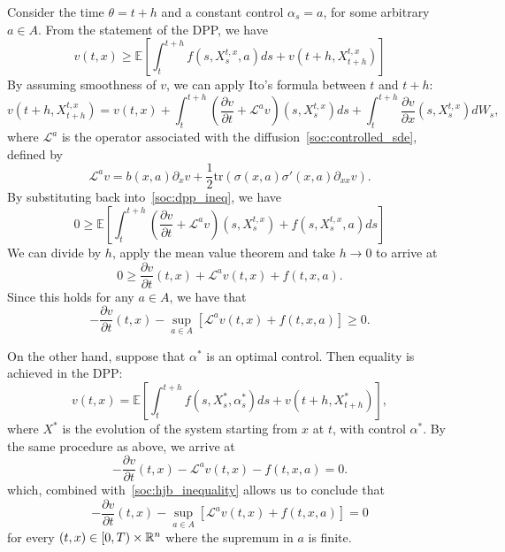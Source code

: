 Consider the time $\theta = t + h$ and a constant control $\alpha_s = a$, for some
arbitrary $a \in A$. From the statement of the DPP, we have
\begin{equation}\label{soc:dpp_ineq}
    v(t,x) \geq \mathbb{E}\left[ \int_t^{t + h} f(s,X^{t,x}_s,a) ds + v(t+h, X^{t,x}_{t+h}) \right]
\end{equation}
By assuming smoothness of $v$, we can apply Ito's formula between $t$ and $t+ h$:
\begin{equation*}
    v(t+h, X^{t,x}_{t+h}) = v(t,x) + \int^{t+h}_t \left( \frac{\partial v}{\partial t} + \mathcal{L}^a v\right)(s, X^{t,x}_s) ds + \int_t^{t+h} \frac{\partial v}{\partial x} (s, X^{t,x}_s) dW_s,
\end{equation*}
where $\mathcal{L}^a$ is the operator associated with the
diffusion~\eqref{soc:controlled_sde}, defined by
\begin{equation}
    \mathcal{L}^a v = b(x,a) \partial_x v + \frac{1}{2}\text{tr} (\sigma(x,a) \sigma'(x,a) \partial_{xx}v).
\end{equation}
By substituting back into~\eqref{soc:dpp_ineq}, we have
\begin{equation*}
    0 \geq \mathbb{E}\left[ \int^{t+h}_t \left( \frac{\partial v}{\partial t} + \mathcal{L}^a v\right)(s, X^{t,x}_s) + f(s, X^{t,x}_s, a)  ds\right]
\end{equation*}
We can divide by $h$, apply the mean value theorem and take $h\to 0$ to arrive at
\begin{equation*}
    0 \geq \frac{\partial v}{\partial t} (t,x) + \mathcal{L}^a v(t,x) + f(t,x,a).
\end{equation*}
Since this holds for any $a \in A$, we have that
\begin{equation}\label{soc:hjb_inequality}
    - \frac{\partial v}{\partial t} (t,x) - \sup_{a \in A} \left[ \mathcal{L}^a v(t,x) + f(t,x,a) \right] \geq 0.
\end{equation}

On the other hand, suppose that $\alpha^*$ is an optimal control.
Then equality is achieved in the DPP:
\begin{equation}
    v(t,x) = \mathbb{E}\left[ \int^{t+h}_t f(s, X^*_s, \alpha^*_s) ds + v(t + h, X^*_{t+h}) \right],
\end{equation}
where $X^*$ is the evolution of the system starting from $x$ at $t$, with control $\alpha^*$.
By the same procedure as above, we arrive at
\begin{equation}
    - \frac{\partial v}{\partial t} (t,x) - \mathcal{L}^a v(t,x) - f(t,x,a) = 0.
\end{equation}
which, combined with~\eqref{soc:hjb_inequality} allows us to conclude that
\begin{equation}
    - \frac{\partial v}{\partial t} (t,x) - \sup_{a \in A} \left[ \mathcal{L}^a v(t,x) + f(t,x,a) \right] = 0
\end{equation}
for every $(t,x) \in [0,T) \times \mathbb{R}^n $ where the supremum in $a$ is finite.

